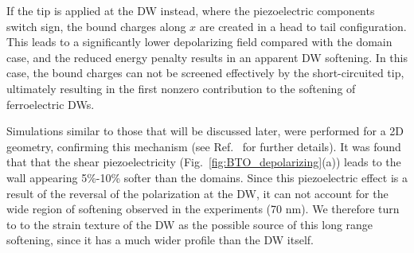 If the tip is applied at the DW instead, where the piezoelectric components switch sign, the bound charges along $x$ are created in a head to tail configuration.
This leads to a significantly lower depolarizing field compared with the domain case, and the reduced energy penalty results in an apparent DW softening.
In this case, the bound charges can not be screened effectively by the short-circuited tip, ultimately resulting in the first nonzero contribution to the softening of ferroelectric DWs. 

Simulations similar to those that will be discussed later, were performed for a 2D geometry, confirming this mechanism (see Ref.~\cite{Stefani2020} for further details).
It was found that that the shear piezoelectricity (Fig.~\ref{fig:BTO_depolarizing}(a)) leads to the wall appearing 5\%-10\% softer than the domains.
Since this piezoelectric effect is a result of the reversal of the polarization at the DW, it can not account for the wide region of softening observed in the experiments (70 nm).
We therefore turn to to the strain texture of the DW as the possible source of this long range softening, since it has a much wider profile than the DW itself.

